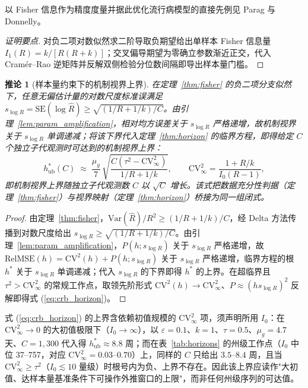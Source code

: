 \documentclass[11pt,a4paper]{article}
\theoremstyle{plain}
\newtheorem{corollary}{推论}
\theoremstyle{definition}
\begin{document}
以 Fisher 信息作为精度度量并据此优化流行病模型的直接先例见 Parag 与 Donnelly\citep{parag2020adaptive}。

\begin{proof}[证明要点]
对负二项对数似然求二阶导取负期望给出单样本 Fisher 信息量 $I_1(R) = k/[R(R+k)]$；交叉偏导期望为零确立参数渐近正交，代入 Cramér--Rao 逆矩阵并反解双侧检验分位数间隔即导出样本量门槛。
\end{proof}

\begin{corollary}[样本量约束下的机制视界上界]\label{cor:crb_horizon}
在定理~\ref{thm:fisher} 的负二项分支似然下，任意无偏估计量的对数尺度标准误满足 $s_{\log R} = \text{SE}(\log\hat{R}) \ge \sqrt{(1/R + 1/k)/C}$。由引理~\ref{lem:param_amplification}，相对均方误差关于 $s_{\log R}$ 严格递增，故机制视界关于 $s_{\log R}$ 单调递减；将该下界代入定理~\ref{thm:horizon} 的临界方程，即得给定 $C$ 个独立子代观测时可达到的机制视界上界：
\begin{equation}
h^*_{\text{ub}}(C) \;\approx\; \frac{\mu_g}{7}\,\sqrt{\frac{C\left(\tau^2 - \text{CV}^2_\infty\right)}{1/R+1/k}},
\qquad \text{CV}^2_\infty = \frac{1+R/k}{I_0(R-1)},
\label{eq:crb_horizon}
\end{equation}
即机制视界上界随独立子代观测数 $C$ 以 $\sqrt{C}$ 增长。该式把数据充分性判据（定理~\ref{thm:fisher}）与视界映射（定理~\ref{thm:horizon}）桥接为同一组闭式。
\end{corollary}

\begin{proof}
由定理~\ref{thm:fisher}，$\text{Var}(\hat{R})/R^2 \ge (1/R+1/k)/C$，经 Delta 方法传播到对数尺度给出 $s_{\log R} \ge \sqrt{(1/R+1/k)/C}$。由引理~\ref{lem:param_amplification}，$P(h;s_{\log R})$ 关于 $s_{\log R}$ 严格递增，故 $\text{RelMSE}(h) = \text{CV}^2(h) + P(h;s_{\log R})$ 关于 $s_{\log R}$ 严格递增，临界方程的根 $h^*$ 关于 $s_{\log R}$ 单调递减；代入 $s_{\log R}$ 的下界即得 $h^*$ 的上界。在超临界且 $\tau^2 > \text{CV}^2_\infty$ 的常规工作点，取领先阶形式 $\text{CV}^2(h) \to \text{CV}^2_\infty$、$P \approx (h s_{\log R})^2$ 反解即得式 (\ref{eq:crb_horizon})。
\end{proof}

式 (\ref{eq:crb_horizon}) 的上界含依赖初值规模的 $\text{CV}^2_\infty$ 项，须声明所用 $I_0$：在 $\text{CV}^2_\infty \to 0$ 的大初值极限下（$I_0 \to \infty$），以 $\varepsilon=0.1$、$k=1$、$\tau=0.5$、$\mu_g=4.7$ 天、$C=1{,}300$ 代入得 $h^*_{\text{ub}} \approx 8.8$ 周；而在表~\ref{tab:horizons} 的州级工作点（$I_0$ 中位 37--757，对应 $\text{CV}^2_\infty = 0.03$--$0.70$）上，同样的 $C$ 只给出 $3.5$--$8.4$ 周，且当 $\text{CV}^2_\infty \ge \tau^2$（$I_0 \lesssim 10$ 量级）时根号内为负、上界不存在。因此该上界应读作"大初值、达样本量基准条件下可操作外推窗口的上限"，而非任何州级序列的可达值。
\end{document}
